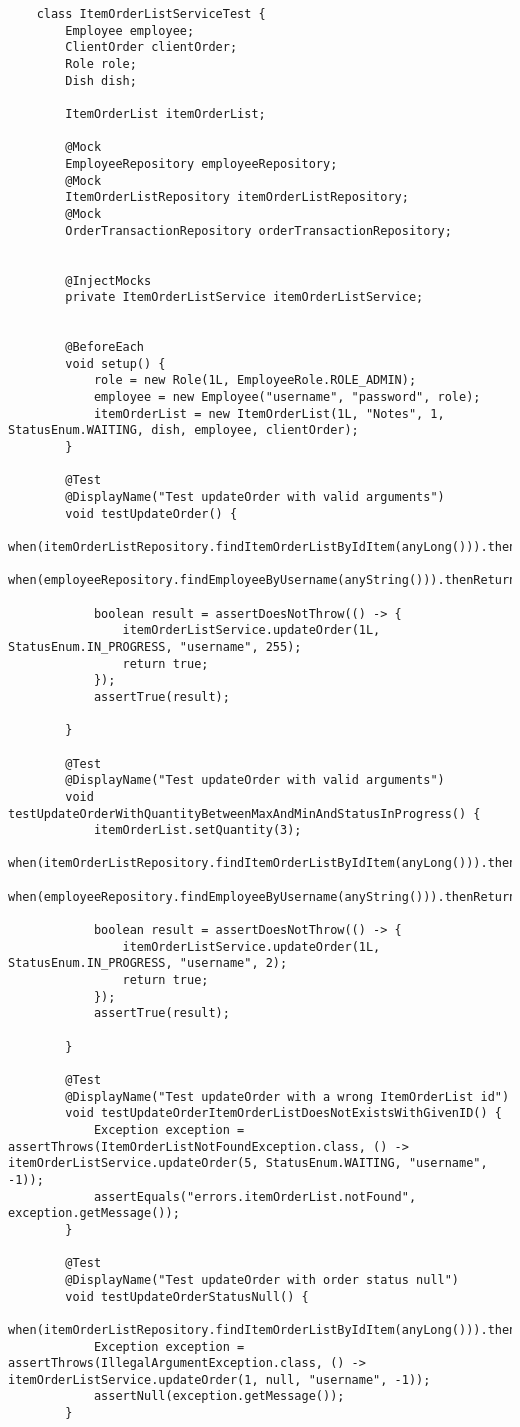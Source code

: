 \label{elsrc:ItemOrderListServiceTest}
\begin{verbatim}
	class ItemOrderListServiceTest {
		Employee employee;
		ClientOrder clientOrder;
		Role role;
		Dish dish;

		ItemOrderList itemOrderList;

		@Mock
		EmployeeRepository employeeRepository;
		@Mock
		ItemOrderListRepository itemOrderListRepository;
		@Mock
		OrderTransactionRepository orderTransactionRepository;


		@InjectMocks
		private ItemOrderListService itemOrderListService;


		@BeforeEach
		void setup() {
			role = new Role(1L, EmployeeRole.ROLE_ADMIN);
			employee = new Employee("username", "password", role);
			itemOrderList = new ItemOrderList(1L, "Notes", 1, StatusEnum.WAITING, dish, employee, clientOrder);
		}

		@Test
		@DisplayName("Test updateOrder with valid arguments")
		void testUpdateOrder() {
			when(itemOrderListRepository.findItemOrderListByIdItem(anyLong())).thenReturn(itemOrderList);
			when(employeeRepository.findEmployeeByUsername(anyString())).thenReturn(employee);

			boolean result = assertDoesNotThrow(() -> {
				itemOrderListService.updateOrder(1L, StatusEnum.IN_PROGRESS, "username", 255);
				return true;
			});
			assertTrue(result);

		}

		@Test
		@DisplayName("Test updateOrder with valid arguments")
		void testUpdateOrderWithQuantityBetweenMaxAndMinAndStatusInProgress() {
			itemOrderList.setQuantity(3);
			when(itemOrderListRepository.findItemOrderListByIdItem(anyLong())).thenReturn(itemOrderList);
			when(employeeRepository.findEmployeeByUsername(anyString())).thenReturn(employee);

			boolean result = assertDoesNotThrow(() -> {
				itemOrderListService.updateOrder(1L, StatusEnum.IN_PROGRESS, "username", 2);
				return true;
			});
			assertTrue(result);

		}

		@Test
		@DisplayName("Test updateOrder with a wrong ItemOrderList id")
		void testUpdateOrderItemOrderListDoesNotExistsWithGivenID() {
			Exception exception = assertThrows(ItemOrderListNotFoundException.class, () -> itemOrderListService.updateOrder(5, StatusEnum.WAITING, "username", -1));
			assertEquals("errors.itemOrderList.notFound", exception.getMessage());
		}

		@Test
		@DisplayName("Test updateOrder with order status null")
		void testUpdateOrderStatusNull() {
			when(itemOrderListRepository.findItemOrderListByIdItem(anyLong())).thenReturn(itemOrderList);
			Exception exception = assertThrows(IllegalArgumentException.class, () -> itemOrderListService.updateOrder(1, null, "username", -1));
			assertNull(exception.getMessage());
		}


\end{verbatim}
